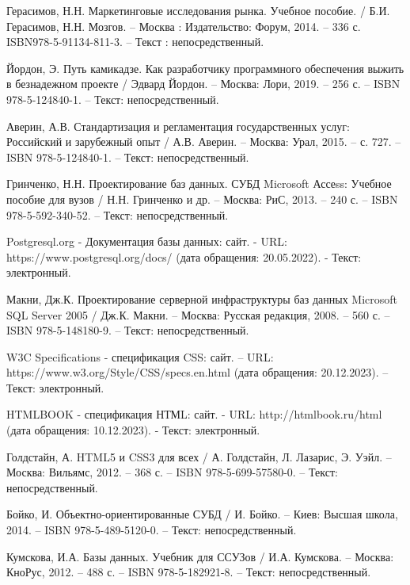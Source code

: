\begin{thebibliography}{20}
     Герасимов, Н.Н. Маркетинговые исследования рынка. Учебное пособие. / Б.И. Герасимов, Н.Н. Мозгов. – Москва : Издательство: Форум, 2014. – 336 с. ISBN978-5-91134-811-3. – Текст : непосредственный.

     Йордон, Э. Путь камикадзе. Как разработчику программного обеспечения выжить в безнадежном проекте / Эдвард Йордон. – Москва: Лори, 2019. – 256 с. – ISBN 978-5-124840-1. – Текст: непосредственный.%

     Аверин, А.В. Стандартизация и регламентация государственных услуг: Российский и зарубежный опыт / А.В. Аверин. – Москва: Урал, 2015. – с. 727. – ISBN 978-5-124840-1. – Текст: непосредственный.%

     Гринченко, Н.Н. Проектирование баз данных. СУБД Microsoft Ассеss: Учебное пособие для вузов / Н.Н. Гринченко и др. – Москва: РиС, 2013. – 240 с. – ISBN 978-5-592-340-52. – Текст: непосредственный.%

     Postgresql.org -\- Документация базы данных: сайт. - URL: https://www.postgresql.org/docs/ (дата обращения: 20.05.2022). - Текст: электронный.

     Макни, Дж.К. Проектирование серверной инфраструктуры баз данных Microsoft SQL Server 2005 / Дж.К. Макни. – Москва: Русская редакция, 2008. – 560 с. – ISBN 978-5-148180-9. – Текст: непосредственный.%

     W3C Specifications -\- спецификация CSS: сайт. – URL: https://www.w3.org/Style/CSS/specs.en.html (дата обращения: 20.12.2023). – Текст: электронный.

     HTMLBOOK -\- спецификация НТМL: сайт. - URL: http://htmlbook.ru/html (дата обращения: 10.12.2023). - Текст: электронный.

 		Голдстайн, А. HTML5 и CSS3 для всех / А. Голдстайн, Л. Лазарис, Э. Уэйл. – Москва: Вильямс, 2012. – 368 с. – ISBN 978-5-699-57580-0. – Текст: непосредственный.

     Бойко, И. Объектно-ориентированные СУБД / И. Бойко. – Киев: Высшая школа, 2014. – ISBN 978-5-489-5120-0. – Текст: непосредственный.%

     Кумскова, И.А. Базы данных. Учебник для ССУЗов / И.А. Кумскова. – Москва: КноРус, 2012. – 488 с. – ISBN 978-5-182921-8. – Текст: непосредственный.%


\end{thebibliography}
